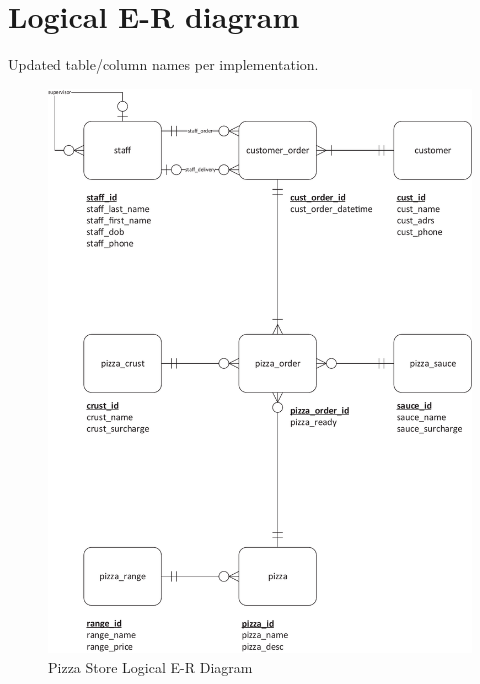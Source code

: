 \newpage
\section{Logical E-R diagram}

Updated table/column names per implementation.

\begin{figure}[H]
\centering
\caption{Pizza Store Logical E-R Diagram}
\includegraphics[scale=0.6]{./img/CSG1207_A1_PONCE_TASK_4_ADVLER_PIZZA.pdf}
\end{figure}